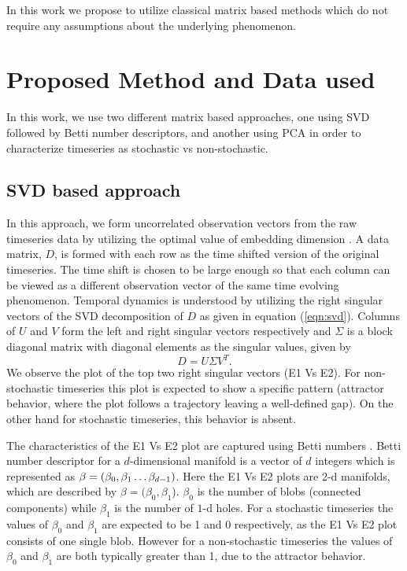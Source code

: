 \documentclass[10pt,conference]{IEEEtran}
\begin{document}
In this work we propose to utilize classical matrix based methods which do not require any assumptions about the underlying phenomenon.

\section{Proposed Method and Data used}

In this work, we use two different matrix based approaches, one using SVD followed by  Betti number descriptors, and  another using PCA in order to characterize timeseries as stochastic vs non-stochastic.

\subsection{SVD based approach}
In this approach, we form uncorrelated observation vectors from the raw timeseries data by utilizing the optimal value of embedding dimension \cite{misra2006}. A data matrix, $D$, is formed with each row  as the  time shifted version of the original timeseries. The time shift is chosen to be large enough so that each column can be viewed as a different observation vector of the same time evolving phenomenon. Temporal dynamics is understood by utilizing the right singular vectors of the SVD decomposition of $D$ as given in equation (\ref{eqn:svd}). Columns of $U$ and $V$  form the left and right singular vectors respectively and $\Sigma$ is a block diagonal matrix with diagonal elements as the singular values, given by
\begin{equation}
  D = U \Sigma V^T.
  \label{eqn:svd}
\end{equation}
   We observe the plot of the top two right singular vectors (E1 Vs E2). For non-stochastic timeseries this plot is expected to show a specific pattern (attractor behavior, where the plot follows a trajectory leaving a well-defined gap). On the other hand for stochastic timeseries, this behavior is absent.

The characteristics of the E1 Vs E2 plot are captured using Betti numbers \cite{jmlr}. Betti number descriptor for a $d$-dimensional manifold is a vector of $d$ integers which is represented as $\beta = (\beta_0, \beta_1 \mathellipsis \beta_{d-1})$. Here the E1 Vs E2 plots are 2-d manifolds, which are described by  $\beta=(\beta_{0}, \beta_{1}$).  $\beta_{0}$ is the number of blobs (connected components) while $\beta_1$ is the number of $1$-d holes. For a stochastic timeseries the values of $\beta_{0}$  and $\beta_1$ are expected to be 1 and 0 respectively, as the E1 Vs E2 plot consists of one single blob. However for a non-stochastic timeseries the values of $\beta_{0}$ and $\beta_1$ are both typically greater than 1, due to the attractor behavior.
\end{document}
